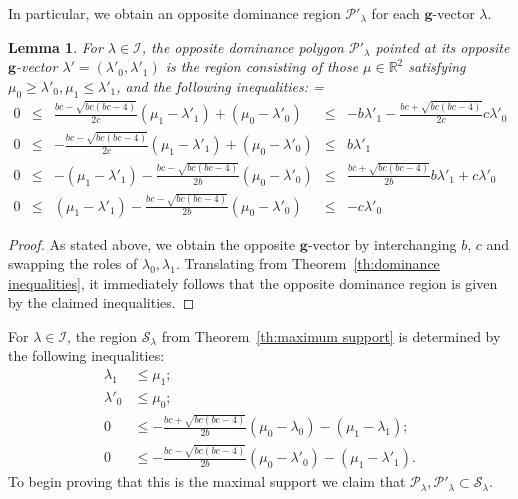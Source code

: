 \documentclass[pdflatex,sn-mathphys]{sn-jnl}%
\theoremstyle{thmstyleone}%
\newtheorem{lemma}[theorem]{Lemma}
\theoremstyle{thmstyletwo}%
\theoremstyle{thmstylethree}%
\newcommand{\bfg}{\boldsymbol{g}}
\newcommand{\cI}{\mathcal{I}}
\newcommand{\cP}{\mathcal{P}}
\newcommand{\cS}{\mathcal{S}}
\newcommand{\RR}{\mathbb{R}}
\begin{document}
  In particular, we obtain an opposite dominance region $\cP'_\lambda$ for each $\bfg$-vector $\lambda$.
  \begin{lemma}
    For $\lambda\in\cI$, the opposite dominance polygon $\cP'_\lambda$ pointed at its opposite $\bfg$-vector $\lambda'=(\lambda'_0,\lambda'_1)$ is the region consisting of those $\mu\in\RR^2$ satisfying $\mu_0 \geq \lambda'_0, \mu_1 \leq\lambda'_1$, and the following inequalities:
    {
      \everymath={\displaystyle}
      \def\arraystretch{2.8}
      \[
        \begin{array}{rcccl}
          0 & \leq & \frac{b c-\sqrt{b c (b c-4)}}{2 c}(\mu_1-\lambda'_1)+(\mu_0-\lambda'_0) & \leq & -b\lambda'_1-\frac{b c+\sqrt{b c (b c-4)}}{2c}c\lambda'_0
          \\
          0 & \leq & -\frac{b c-\sqrt{b c (b c-4)}}{2 c}(\mu_1-\lambda'_1)+(\mu_0-\lambda'_0) & \leq & b\lambda'_1
          \\
          0 & \leq &  -(\mu_1-\lambda'_1)-\frac{b c-\sqrt{b c (b c-4)}}{2 b}(\mu_0-\lambda'_0) & \leq & \frac{b c+\sqrt{b c (b c-4)}}{2b}b\lambda'_1+c\lambda'_0
          \\
          0 & \leq & (\mu_1-\lambda'_1) - \frac{b c-\sqrt{b c (b c-4)}}{2 b} (\mu_0-\lambda'_0) & \leq & -c \lambda'_0
        \end{array}
      \]
    }
  \end{lemma}
  \begin{proof}
    As stated above, we obtain the opposite $\bfg$-vector by interchanging $b$, $c$ and swapping the roles of $\lambda_0,\lambda_1$.
    Translating from Theorem~\ref{th:dominance inequalities}, it immediately follows that the opposite dominance region is given by the claimed inequalities.
  \end{proof}

  For $\lambda\in\cI$, the region $\cS_\lambda$ from Theorem~\ref{th:maximum support} is determined by the following inequalities:
  \begin{align*}
    \lambda_1 &\leq \mu_1;\\
    \lambda'_0 &\leq \mu_0;\\
    0 &\leq -\frac{b c+\sqrt{b c (b c-4)}}{2 b}(\mu_0-\lambda_0)-(\mu_1-\lambda_1);\\
    0 &\leq -\frac{b c-\sqrt{b c (b c-4)}}{2 b}(\mu_0-\lambda'_0) -(\mu_1-\lambda'_1).
  \end{align*}
  To begin proving that this is the maximal support we claim that $\cP_\lambda,\cP'_\lambda\subset\cS_\lambda$.
\end{document}
